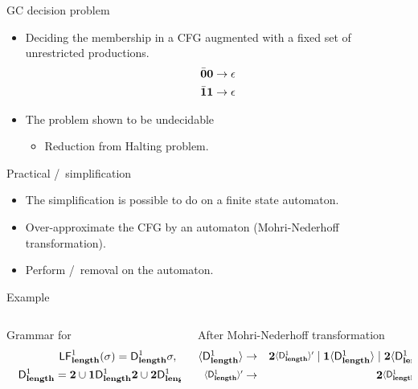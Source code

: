 \documentclass[xcolor=x11names,compress,mathserif]{beamer}
\renewcommand{\(}{\begin{columns}}
\renewcommand{\)}{\end{columns}}
\newcommand{\<}[1]{\begin{column}{#1}}
\renewcommand{\>}{\end{column}}
\begin{document}
\begin{frame}{GC decision problem}
\begin{itemize}
\item Deciding the
  membership in  a CFG augmented  with a
  fixed set of unrestricted productions.
  \begin{align*}
    \bar{\mathbf{0}}\mathbf{0}    \rightarrow    \epsilon\\
    \bar{\mathbf{1}}\mathbf{1}    \rightarrow   \epsilon\\
  \end{align*}
\item The problem shown to be undecidable
  \begin{itemize}
  \item Reduction from Halting problem.
  \end{itemize}
\end{itemize}
\end{frame}
\begin{frame}{Practical \bcar/\bcdr\  simplification}

\begin{itemize}
\item The simplification is possible to do on a finite state automaton.
\item Over-approximate the CFG by an automaton
  (Mohri-Nederhoff transformation).
\item Perform \acar/\acdr\ removal on the automaton.
\end{itemize}

\end{frame}
\begin{frame}{Example}
  \scriptsize
  \begin{columns}[c]
    \begin{column}[T]{.5\textwidth}
      {Grammar for }
      \begin{eqnarray*}
        &&  \mathsf{LF}_{\mathit {\mathbf{length}} }^{1}( {\mathit \sigma}) = \mathsf{D}_{\mathit {\mathbf{length}}}^{1}\sigma,~\mbox{and}\\
        &&   \mathsf{D}_{\mathit {\mathbf{length}}}^{1} = {\mathbf{2}} \cup \mathbf{1}\mathsf{D}_{\mathit {\mathbf{length}}}^{1}{\mathbf{2}}
        \cup {\mathbf{2}}\mathsf{D}_{\mathit {\mathbf{length}}}^{1}{{\mathbf{2}}}
      \end{eqnarray*}
    \end{column}
    \begin{column}[T]{.5\textwidth}
      After Mohri-Nederhoff transformation
       \begin{eqnarray*}              
         \var{\Df{\plength}{1}}   &\rightarrow&   \clazy\varnew{\Df{\plength}{1}}
         \mid                 \acdr\var{\Df{\plength}{1}}                 \mid
         \clazy\var{\Df{\plength}{1}}\\  \varnew{\Df{\plength}{1}}  &\rightarrow&
         \clazy\varnew{\Df{\plength}{1}} \mid \epsilon
       \end{eqnarray*}
    \end{column}
  \end{columns}
\end{frame}
\end{document}
